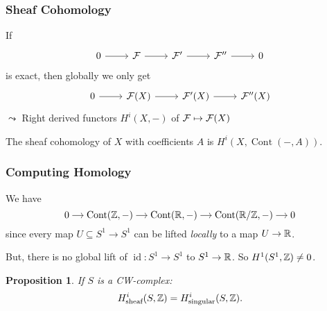 \documentclass{beamer}
\newtheorem{proposition}{Proposition}
\DeclareMathOperator{\Cont}{Cont}
\DeclareMathOperator{\id}{id}
\begin{document}
\begin{frame}
    \frametitle{Sheaf Cohomology}

    If
    \begin{equation*}
        \begin{tikzcd}[ampersand replacement=\&]
            0 \rar \& \mcF \rar \& \mcF' \rar \& \mcF'' \rar \& 0
        \end{tikzcd}
    \end{equation*}
    is exact, then globally we only get
    \begin{equation*}
        \begin{tikzcd}[ampersand replacement=\&]
            0 \rar \& \mcF(X) \rar \& \mcF'(X) \rar \& \mcF''(X)
        \end{tikzcd}
    \end{equation*}
    \pause
    $\leadsto$ Right derived functors $H^i(X, -)$ of $\mathcal{F} \mapsto \mathcal{F}(X)$
    \begin{definition}
        The sheaf cohomology of $X$ with coefficients $A$ is $H^i(X, \Cont(- , A))$.
    \end{definition}

\end{frame}

\begin{frame}
    \frametitle{Computing Homology}

    We have
    \begin{equation*}
        \begin{tikzcd}[ampersand replacement=\&, sep=small, cramped]
            0 \rar \& \Cont(\bbZ, -) \rar \& \Cont(\bbR, -) \rar
            \& \Cont(\bbR/\bbZ, -) \rar \& 0
        \end{tikzcd}
    \end{equation*}
    since every map $U\subseteq S^1 \to S^1$ can be
    lifted \emph{locally} to a map $U \to \mathbb{R}$.

    \medskip
    But, there is no global lift of $\id\colon S^1 \to S^1$
    to $S^1 \to \mathbb{R}$.
    So $H^1(S^1, \mathbb{Z}) \neq 0$.

    \medskip
    \pause
    \begin{proposition}
        If $S$ is a CW-complex:
        \begin{equation*}
            H^i_{\text{sheaf}}(S, \mathbb{Z}) = H^i_{\text{singular}}(S, \mathbb{Z}).
        \end{equation*}
    \end{proposition}

\end{frame}
\end{document}
